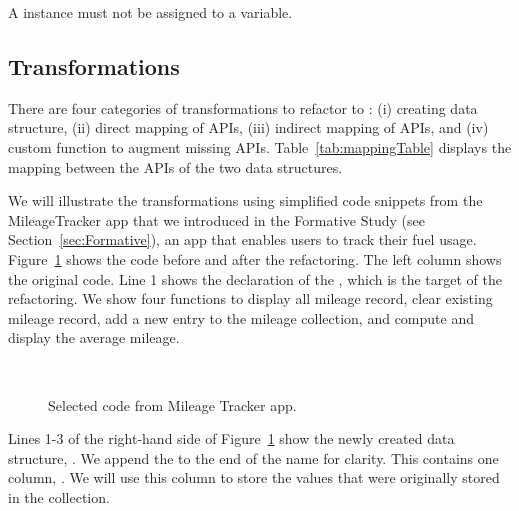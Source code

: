 \documentclass[preprint]{sigplanconf}
\begin{document}
\PTwo A \NC{} instance must not be assigned to a variable.

\subsection{Transformations}
\label{sec:transformations}

There are four categories of transformations to refactor \NC{} to : 
(i) creating \CDT{} data structure, (ii) direct mapping of APIs, (iii) indirect mapping of APIs, and (iv) custom function to augment missing APIs. Table~\ref{tab:mappingTable} displays the mapping between the APIs of the two data structures.

We will illustrate the transformations using simplified code snippets from the MileageTracker app that we introduced in the Formative Study (see Section~\ref{sec:Formative}), an app that enables users to track their fuel usage. Figure~\ref{fig:codeTransformations} shows the code before and after the refactoring. The left column shows the original code. 
Line 1 shows the declaration of the  \NC{}, which is the target of the refactoring. We show four functions to display all mileage record, clear existing mileage record, add a new entry to the mileage collection, and compute and display the average mileage. \\

\begin{figure}
   \centering
    \mbox{
      \subfigure[before]{
      
      \label{fig:aicOverload}
      }
      \hspace{0.2in}
      \subfigure[after]{
      
      \label{fig:lambdaOverload}
      }
    }
    \caption{Selected code from Mileage Tracker app.}
    \label{fig:codeTransformations}
\end{figure}

Lines 1-3 of the right-hand side of Figure~\ref{fig:codeTransformations} show the newly created data structure, . We append the  to the end of the name for clarity. This  contains one column, . We will use this column to store the values that were originally stored in the  collection.
\\
\end{document}
